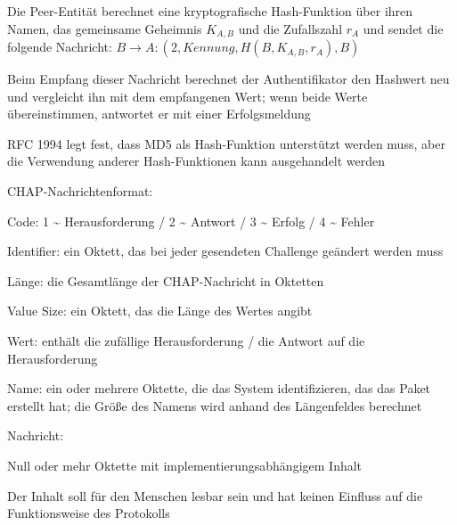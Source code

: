 \documentclass[a4paper]{article}
\begin{document}
\begin{multicols}{3}
\begin{itemize*}
\begin{itemize*}
\begin{itemize*}
                        \item Die Peer-Entität berechnet eine kryptografische Hash-Funktion über ihren Namen, das gemeinsame Geheimnis $K_{A,B}$ und die Zufallszahl $r_A$ und sendet die folgende Nachricht: $B \rightarrow A: (2, Kennung, H(B, K_{A,B}, r_A), B)$
                        \item Beim Empfang dieser Nachricht berechnet der Authentifikator den Hashwert neu und vergleicht ihn mit dem empfangenen Wert; wenn beide Werte übereinstimmen, antwortet er mit einer Erfolgsmeldung
                        \item RFC 1994 legt fest, dass MD5 als Hash-Funktion unterstützt werden muss, aber die Verwendung anderer Hash-Funktionen kann ausgehandelt werden
                  \end{itemize*}
            \end{itemize*}
            \item CHAP-Nachrichtenformat:
            \begin{itemize*}
                  \item Code: 1 \textasciitilde{} Herausforderung / 2 \textasciitilde{} Antwort / 3 \textasciitilde{} Erfolg / 4 \textasciitilde{} Fehler
                  \item Identifier: ein Oktett, das bei jeder gesendeten Challenge geändert werden muss
                  \item Länge: die Gesamtlänge der CHAP-Nachricht in Oktetten
                  \item Value Size: ein Oktett, das die Länge des Wertes angibt
                  \item Wert: enthält die zufällige Herausforderung / die Antwort auf die Herausforderung
                  \item Name: ein oder mehrere Oktette, die das System identifizieren, das das Paket erstellt hat; die Größe des Namens wird anhand des Längenfeldes berechnet
                  \item Nachricht:
                  \begin{itemize*}
                        \item Null oder mehr Oktette mit implementierungsabhängigem Inhalt
                        \item Der Inhalt soll für den Menschen lesbar sein und hat keinen Einfluss auf die Funktionsweise des Protokolls
                  \end{itemize*}

\end{itemize*}
\end{itemize*}
\end{multicols}
\end{document}
